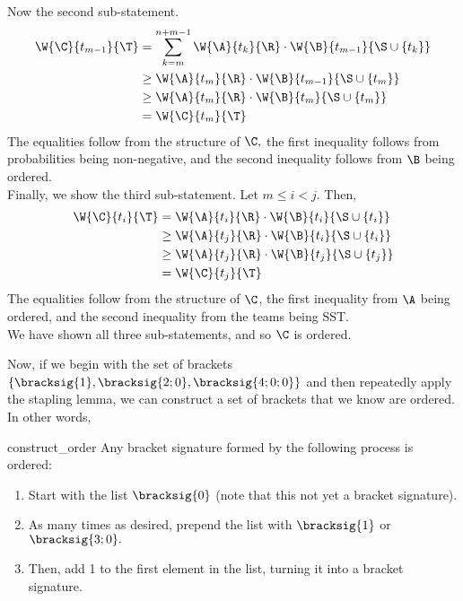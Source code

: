 {{    Now the second sub-statement.
    \begin{align*}
        \W{\C}{t_{m-1}}{\T} &= \sum_{k=m}^{n+m-1} \W{\A}{t_k}{\R} \cdot \W{\B}{t_{m-1}}{\S \cup \{t_k\}}\\
        &\geq \W{\A}{t_m}{\R} \cdot \W{\B}{t_{m-1}}{\S \cup \{t_m\}}\\
        &\geq \W{\A}{t_m}{\R} \cdot \W{\B}{t_{m}}{\S \cup \{t_m\}}\\
        &= \W{\C}{t_{m}}{\T}
    \end{align*}
    The equalities follow from the structure of $\C,$ the first inequality follows from probabilities being non-negative, and the second inequality follows from $\B$ being ordered.\\

    Finally, we show the third sub-statement. Let $m \leq i < j.$ Then,
    \begin{align*}
        \W{\C}{t_i}{\T} &= \W{\A}{t_i}{\R} \cdot \W{\B}{t_i}{\S \cup \{t_i\}}\\
        &\geq \W{\A}{t_j}{\R} \cdot \W{\B}{t_i}{\S \cup \{t_i\}}\\
        &\geq \W{\A}{t_j}{\R} \cdot \W{\B}{t_j}{\S \cup \{t_j\}}\\
        &= \W{\C}{t_j}{\T}
    \end{align*}
    The equalities follow from the structure of $\C$, the first inequality from $\A$ being ordered, and the second inequality from the teams being SST.\\

    We have shown all three sub-statements, and so $\C$ is ordered.
    }{}

    Now, if we begin with the set of brackets $\{\bracksig{1}, \bracksig{2; 0}, \bracksig{4; 0; 0}\}$ and then repeatedly apply the stapling lemma, we can construct a set of brackets that we know are ordered. In other words,

    \begin{corollary}{}{construct_order}
        Any bracket signature formed by the following process is ordered:
        \begin{enumerate}
            \item Start with the list $\bracksig{0}$ (note that this not yet a bracket signature).
            \item As many times as desired, prepend the list with $\bracksig{1}$ or $\bracksig{3; 0}.$
            \item Then, add 1 to the first element in the list, turning it into a bracket signature.
        \end{enumerate}
    \end{corollary}

}
